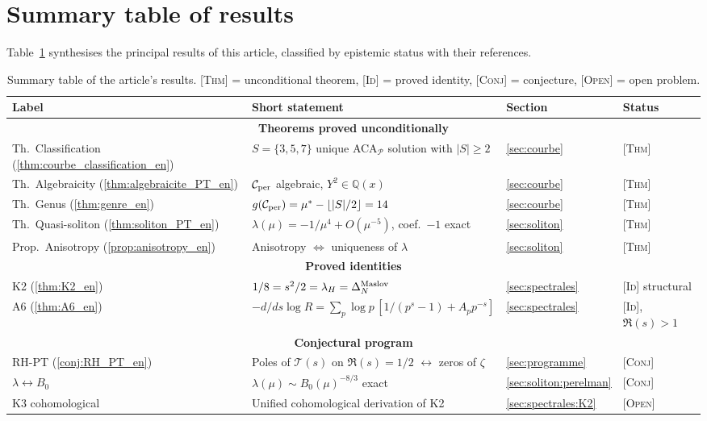 \section{Summary table of results}
\label{app:resultats_en}

Table~\ref{tab:resultats_en} synthesises the principal results of this article, classified by epistemic status with their references.

\begin{table}[htbp]
\centering
\small
\begin{tabular}{@{}p{3cm}p{6cm}p{2cm}p{3.5cm}@{}}
\toprule
Label & Short statement & Section & Status \\
\midrule
\multicolumn{4}{c}{\textsf{\textbf{Theorems proved unconditionally}}} \\[2pt]
Th.~Classification (\ref{thm:courbe_classification_en}) & $S = \{3, 5, 7\}$ unique ACA$_{\mathcal P}$ solution with $|S| \geq 2$ & \ref{sec:courbe} & \textsc{[Thm]} \\
Th.~Algebraicity (\ref{thm:algebraicite_PT_en}) & $\mathcal{C}_{\rm per}$ algebraic, $Y^{2} \in \mathbb Q(x)$ & \ref{sec:courbe} & \textsc{[Thm]} \\
Th.~Genus (\ref{thm:genre_en}) & $g(\mathcal{C}_{\rm per}) = \mu^{*} - \lfloor |S|/2 \rfloor = 14$ & \ref{sec:courbe} & \textsc{[Thm]} \\
Th.~Quasi-soliton (\ref{thm:soliton_PT_en}) & $\lambda(\mu) = -1/\mu^{4} + O(\mu^{-5})$, coef.\ $-1$ exact & \ref{sec:soliton} & \textsc{[Thm]} \\
Prop.~Anisotropy (\ref{prop:anisotropy_en}) & Anisotropy $\Leftrightarrow$ uniqueness of $\lambda$ & \ref{sec:soliton} & \textsc{[Thm]} \\
\midrule
\multicolumn{4}{c}{\textsf{\textbf{Proved identities}}} \\[2pt]
K2 (\ref{thm:K2_en}) & $1/8 = s^{2}/2 = \lambda_H = \Delta_N^{\rm Maslov}$ & \ref{sec:spectrales} & \textsc{[Id]} structural \\
A6 (\ref{thm:A6_en}) & $-d/ds \log R = \sum_p \log p\,[1/(p^{s}{-}1) + A_p p^{-s}]$ & \ref{sec:spectrales} & \textsc{[Id]}, $\Re(s) > 1$ \\
\midrule
\multicolumn{4}{c}{\textsf{\textbf{Conjectural program}}} \\[2pt]
RH-PT (\ref{conj:RH_PT_en}) & Poles of $\mathcal T(s)$ on $\Re(s) = 1/2$ $\leftrightarrow$ zeros of $\zeta$ & \ref{sec:programme} & \textsc{[Conj]} \\
$\lambda \leftrightarrow B_0$ & $\lambda(\mu) \sim B_0(\mu)^{-8/3}$ exact & \ref{sec:soliton:perelman} & \textsc{[Conj]} \\
K3 cohomological & Unified cohomological derivation of K2 & \ref{sec:spectrales:K2} & \textsc{[Open]} \\
\bottomrule
\end{tabular}
\caption{Summary table of the article's results. \textsc{[Thm]} = unconditional theorem, \textsc{[Id]} = proved identity, \textsc{[Conj]} = conjecture, \textsc{[Open]} = open problem.}
\label{tab:resultats_en}
\end{table}

